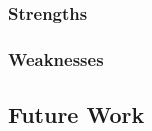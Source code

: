 \documentclass[12pt]{article}  %
\begin{document}
\subsubsection{Strengths}
\subsubsection{Weaknesses}
\subsection{Future Work}























































\end{document}
